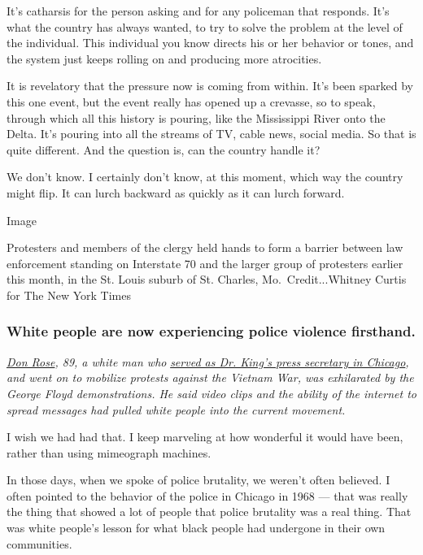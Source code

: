 It's catharsis for the person asking and for any policeman that
responds. It's what the country has always wanted, to try to solve the
problem at the level of the individual. This individual you know directs
his or her behavior or tones, and the system just keeps rolling on and
producing more atrocities.

It is revelatory that the pressure now is coming from within. It's been
sparked by this one event, but the event really has opened up a
crevasse, so to speak, through which all this history is pouring, like
the Mississippi River onto the Delta. It's pouring into all the streams
of TV, cable news, social media. So that is quite different. And the
question is, can the country handle it?

We don't know. I certainly don't know, at this moment, which way the
country might flip. It can lurch backward as quickly as it can lurch
forward.

Image

Protesters and members of the clergy held hands to form a barrier
between law enforcement standing on Interstate 70 and the larger group
of protesters earlier this month, in the St. Louis suburb of St.
Charles, Mo.~Credit...Whitney Curtis for The New York Times

\hypertarget{white-people-are-now-experiencing-police-violence-firsthand}{%
\subsubsection{White people are now experiencing police violence
firsthand.}\label{white-people-are-now-experiencing-police-violence-firsthand}}

\href{https://www.nytimes.com/1988/07/24/weekinreview/the-nation-in-chicago-outsiders-of-1968-are-insiders-now.html?searchResultPosition=10}{\emph{Don
Rose}}\emph{, 89, a white man who}
\href{https://www.thenation.com/article/archive/don-rose-sixty-years-chicagos-warrior-justice/}{\emph{served
as Dr. King's press secretary in Chicago}}\emph{, and went on to
mobilize protests against the Vietnam War, was exhilarated by the George
Floyd demonstrations. He said video clips and the ability of the
internet to spread messages had pulled white people into the current
movement.}

I wish we had had that. I keep marveling at how wonderful it would have
been, rather than using mimeograph machines.

In those days, when we spoke of police brutality, we weren't often
believed. I often pointed to the behavior of the police in Chicago in
1968 --- that was really the thing that showed a lot of people that
police brutality was a real thing. That was white people's lesson for
what black people had undergone in their own communities.

